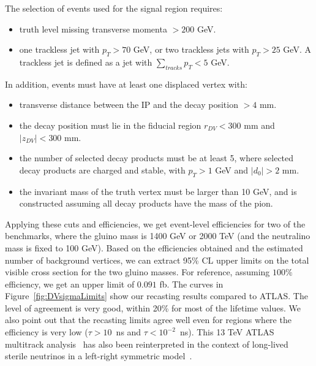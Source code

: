 The selection of events used for the signal region requires:

\begin{itemize}
\item{truth level missing transverse momenta $>200$ GeV.}
\item{one trackless jet with $p_{T}>70$ GeV, or two trackless jets with $p_{T}>25$ GeV. A trackless jet is defined as a jet with $\sum_{tracks} p_{T}<5$ GeV.}
\end{itemize}

In addition, events must have at least one displaced vertex with:

\begin{itemize}
\item{transverse distance between the IP and the decay position $>4$ mm.}
\item{the decay position must lie in the fiducial region $r_{DV}<300$ mm and $|z_{DV}|<300$ mm.}
\item{the number of selected decay products must be at least 5, where selected decay products are charged and stable, with $p_{T}>1$ GeV and $|d_{0}|>2$ mm.}
\item{the invariant mass of the truth vertex must be larger than 10 GeV, and is constructed assuming all decay products have the mass of the pion.}
\end{itemize}

Applying these cuts and efficiencies, we get event-level efficiencies for two of
the benchmarks, where the gluino mass is 1400 GeV or 2000 TeV (and the
neutralino mass is fixed to 100 GeV). Based on the efficiencies obtained and the
estimated number of background vertices, we can extract 95\% CL upper limits on
the total visible cross section for the two gluino masses. For reference,
assuming $100\%$ efficiency, we get an upper limit of $0.091$ fb. The
curves in Figure~\ref{fig:DVsigmaLimits} show our recasting results compared to
ATLAS. The level of agreement is very good, within 20\% for most of the
lifetime values. We also point out that the recasting limits agree well
even for regions where the efficiency is very low ($\tau > 10$~ns
and $\tau < 10^{-2}$~ns). 
This 13 TeV ATLAS multitrack analysis~\cite{Aaboud:2017iio} has also been reinterpreted in the
context of long-lived sterile neutrinos in a left-right symmetric model~\cite{Cottin:2018kmq}.

